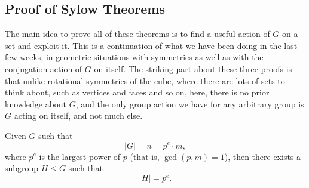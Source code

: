 \subsection{Proof of Sylow Theorems}
The main idea to prove all of these theorems is to find a useful action of $G$ on a set and exploit it. This is a continuation of what we have been doing in the last few weeks, in geometric situations with symmetries as well as with the conjugation action of $G$ on itself. The striking part about these three proofs is that unlike rotational symmetries of the cube, where there are lots of sets to think about, such as vertices and faces and so on, here, there is no prior knowledge about $G$, and the only group action we have for any arbitrary group is $G$ acting on itself, and not much else. 

\begin{theorem}[Sylow I]

Given $G$ such that \[|G| = n = p^e \cdot m,\] where $p^e$ is the largest power of $p$ (that is, $\gcd(p, m) = 1$), then there exists a subgroup $H \leq G$ such that \[|H| = p^e.\]
\end{theorem}

